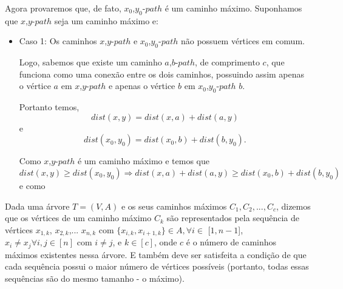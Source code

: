 \documentclass[a4paper,12pt]{article}
\begin{document}
    	Agora provaremos que, de fato, $x_0$,$y_0$-$path$ é um
    	caminho máximo.
    	Suponhamos que $x$,$y$-$path$ seja um caminho máximo e:

    	\begin{itemize}
            \item Caso 1: Os caminhos $x$,$y$-$path$ e 
            $x_0$,$y_0$-$path$ não possuem vértices em comum.
         


            Logo, sabemos que existe um caminho $a$,$b$-$path$, 
            de comprimento $c$,
            que funciona como uma conexão entre os dois caminhos,
            possuindo assim apenas o vértice $a$ em 
            $x$,$y$-$path$ e apenas o vértice $b$ em
            $x_0$,$y_0$-$path$ $b$.

            Portanto temos,
            $$ dist(x,y) = dist(x,a) + dist(a,y) $$ e
            $$ dist(x_0,y_0) = dist(x_0,b) + dist(b,y_0).$$

            Como $x$,$y$-$path$ é um caminho máximo e  temos que 
            $$dist(x,y)\ge dist(x_0,y_0) \Rightarrow 
            dist(x,a) + dist(a,y)\ge dist(x_0,b) + dist(b,y_0)$$ 
            e como


        \end{itemize}




    	\newpage



        Dada uma árvore $T = (V,A)$ e os seus caminhos máximos 
        $C_1, C_2,..., C_c$, dizemos que os vértices de um caminho
        máximo $C_k$ são representados pela sequência de vértices 
        $x_{1, k}$, $x_{2, k}$,... $x_{n, k}$ com 
        $\{x_{i, k}, x_{i+1, k}\} \in A, \forall i \in$ [$1, n-1$],
        $x_i\neq x_j \forall i, j \in [n]$ 
        com $i \neq j$, 
        e $k \in [c]$, 
        onde $c$ é o número de caminhos máximos existentes nessa
        árvore.
        E também deve ser satisfeita a condição de que cada 
        sequência possui o maior número de vértices possíveis 
        (portanto, todas essas sequências são do mesmo tamanho - 
        o máximo).

        \bigskip
\end{document}
